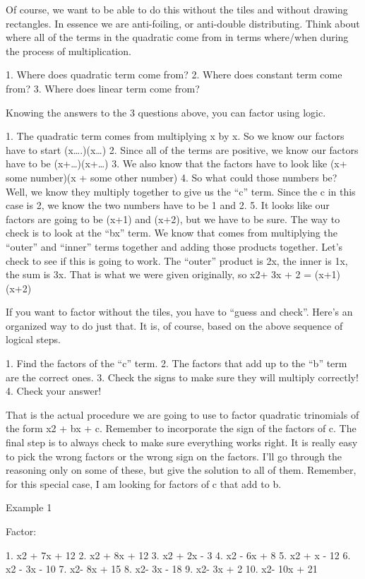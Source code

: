 Of course, we want to be able to do this without the tiles and without drawing rectangles. In essence we are anti-foiling, or anti-double distributing. Think about where all of the terms in the quadratic come from in terms where/when during the process of multiplication.

1. Where does quadratic term come from?
2. Where does constant term come from?
3. Where does linear term come from?

Knowing the answers to the 3 questions above, you can factor using logic.

1. The quadratic term comes from multiplying x by x. So we know our factors have to start (x\ldots{}.)(x\ldots{})
2. Since all of the terms are positive, we know our factors have to be (x+\ldots{})(x+\ldots{})
3. We also know that the factors have to look like (x+ some number)(x + some other number)
4. So what could those numbers be? Well, we know they multiply together to give us the ``c'' term. Since the c in this case is 2, we know the two numbers have to be 1 and 2.
5. It looks like our factors are going to be (x+1) and (x+2), but we have to be sure. The way to check is to look at the ``bx'' term. We know that comes from multiplying the ``outer'' and ``inner'' terms together and adding those products together. Let's check to see if this is going to work. The ``outer'' product is 2x, the inner is 1x, the sum is 3x. That is what we were given originally, so x2+ 3x + 2 = (x+1)(x+2)

If you want to factor without the tiles, you have to ``guess and check''. Here's an organized way to do just that. It is, of course, based on the above sequence of logical steps.

1. Find the factors of the ``c'' term.
2. The factors that add up to the ``b'' term are the correct ones.
3. Check the signs to make sure they will multiply correctly!
4. Check your answer!

That is the actual procedure we are going to use to factor quadratic trinomials of the form x2 + bx + c. 
Remember to incorporate the sign of the factors of c. The final step is to always check to make sure everything works right. It is really easy to pick the wrong factors or the wrong sign on the factors. I'll go through the reasoning only on some of these, but give the solution to all of them. Remember, for this special case, I am looking for factors of c that add to b. 

Example 1

Factor: 

1. x2 + 7x + 12		2. x2 + 8x + 12		3. x2 + 2x - 3		4. x2 - 6x + 8
5. x2 + x - 12		6. x2 - 3x - 10		7. x2- 8x + 15		8. x2- 3x - 18
9. x2- 3x + 2		10. x2- 10x + 21

